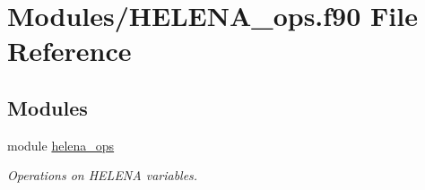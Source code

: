 \hypertarget{HELENA__ops_8f90}{}\section{Modules/\+H\+E\+L\+E\+N\+A\+\_\+ops.f90 File Reference}
\label{HELENA__ops_8f90}
\subsection*{Modules}
\begin{DoxyCompactItemize}
\item 
module \hyperlink{namespacehelena__ops}{helena\+\_\+ops}
\begin{DoxyCompactList}\small\item\em Operations on H\+E\+L\+E\+NA variables. \end{DoxyCompactList}\end{DoxyCompactItemize}
